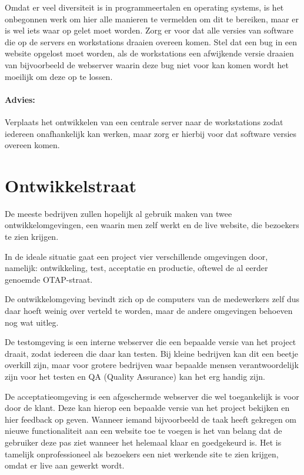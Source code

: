 Omdat er veel diversiteit is in programmeertalen en operating systems, is het onbegonnen werk om hier alle manieren te vermelden om dit te bereiken, maar er is wel iets waar op gelet moet worden. Zorg er voor dat alle versies van software die op de servers en workstations draaien overeen komen. Stel dat een bug in een website opgelost moet worden, als de workstations een afwijkende versie draaien van bijvoorbeeld de webserver waarin deze bug niet voor kan komen wordt het moeilijk om deze op te lossen.

\paragraph{Advies:} Verplaats het ontwikkelen van een centrale server naar de workstations zodat iedereen onafhankelijk kan werken, maar zorg er hierbij voor dat software versies overeen komen.

\section{Ontwikkelstraat}

De meeste bedrijven zullen hopelijk al gebruik maken van twee ontwikkelomgevingen, een waarin men zelf werkt en de live website, die bezoekers te zien krijgen.

In de ideale situatie gaat een project vier verschillende omgevingen door, namelijk: ontwikkeling, test, acceptatie en productie, oftewel de al eerder genoemde OTAP-straat. 

De ontwikkelomgeving bevindt zich op de computers van de medewerkers zelf dus daar hoeft weinig over verteld te worden, maar de andere omgevingen behoeven nog wat uitleg.

De testomgeving is een interne webserver die een bepaalde versie van het project draait, zodat iedereen die daar kan testen. Bij kleine bedrijven kan dit een beetje overkill zijn, maar voor grotere bedrijven waar bepaalde mensen verantwoordelijk zijn voor het testen en QA (Quality Assurance) kan het erg handig zijn.

De acceptatieomgeving is een afgeschermde webserver die wel toegankelijk is voor door de klant. Deze kan hierop een bepaalde versie van het project bekijken en hier feedback op geven. Wanneer iemand bijvoorbeeld de taak heeft gekregen om nieuwe functionaliteit aan een website toe te voegen is het van belang dat de gebruiker deze pas ziet wanneer het helemaal klaar en goedgekeurd is. Het is tamelijk onprofessioneel als bezoekers een niet werkende site te zien krijgen, omdat er live aan gewerkt wordt.

